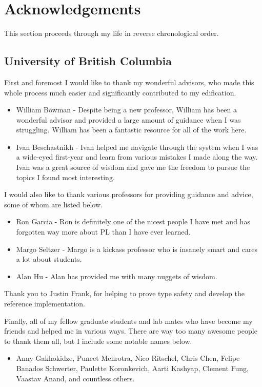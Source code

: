 \chapter{Acknowledgements}
This section proceeds through my life in reverse chronological order.

\section*{University of British Columbia}
First and foremost I would like to thank my wonderful advisors, who made this whole process much easier and significantly contributed to my edification.
\begin{itemize}
    \item William Bowman - Despite being a new professor, William has been a wonderful advisor and provided a large amount of guidance when I was struggling.
    William has been a fantastic resource for all of the work here.
    \item Ivan Beschastnikh - Ivan helped me navigate through the system when I was a wide-eyed first-year and learn from various mistakes I made along the way.
    Ivan was a great source of wisdom and gave me the freedom to pursue the topics I found most interesting.
\end{itemize}

I would also like to thank various professors for providing guidance and advice, some of whom are listed below.
\begin{itemize}
    \item Ron Garcia - Ron is definitely one of the nicest people I have met and has forgotten way more about PL than I have ever learned.
    \item Margo Seltzer - Margo is a kickass professor who is insanely smart and cares a lot about students.
    \item Alan Hu - Alan has provided me with many nuggets of wisdom.
\end{itemize}

Thank you to Justin Frank, for helping to prove type safety and develop the reference implementation.

Finally, all of my fellow graduate students and lab mates who have become my friends and helped me in various ways. There are way too many awesome people to thank them all, but I include some notable names below.
\begin{itemize}
    \item Anny Gakhokidze, Puneet Mehrotra, Nico Ritschel, Chris Chen, Felipe Banados Schwerter, Paulette Koronkevich, Aarti Kashyap, Clement Fung, Vaastav Anand, and countless others.
\end{itemize}

